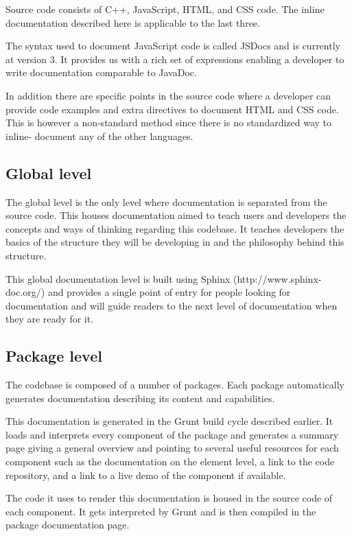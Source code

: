 \documentclass[journal]{IEEEtran}
\begin{document}
Source code consists of C++, JavaScript, HTML, and CSS code. The inline
documentation described here is applicable to the last three.

The syntax used to document JavaScript code is called JSDocs and is currently
at version 3\cite{JS_Annotations}\cite{JSDoc}. It provides us with a rich set of expressions
enabling a developer to write documentation comparable to JavaDoc.

In addition there are specific points in the source code where a developer can
provide code examples and extra directives to document HTML and CSS code. This
is however a non-standard method since there is no standardized way to inline-
document any of the other languages.

\subsection{Global level}
The global level is the only level where documentation is separated from the source code.
This houses documentation aimed to teach users and developers the concepts and
ways of thinking regarding this codebase.
It teaches developers the basics of the structure they will be developing in and
the philosophy behind this structure.

This global documentation level is built using Sphinx (http://www.sphinx-doc.org/)
and provides a single point of entry for people looking for documentation and
will guide readers to the next level of documentation when they are ready for it.

\subsection{Package level}
The codebase is composed of a number of packages. Each package automatically
generates documentation describing its content and capabilities.

This documentation is generated in the Grunt build cycle described earlier.
It loads and interprets every component of the package and generates a summary
page giving a general overview and pointing to several useful resources for each
component such as the documentation on the element level, a link to the code
repository, and a link to a live demo of the component if available.

The code it uses to render this documentation is housed in the source code of
each component. It gets interpreted by Grunt and is then compiled in the package
documentation page.
\end{document}
